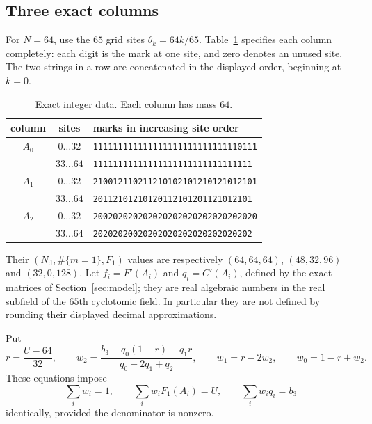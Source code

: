 \documentclass[11pt]{article}
\theoremstyle{definition}\newtheorem{definition}[theorem]{Definition}
\theoremstyle{remark}\newtheorem{remark}[theorem]{Remark}
\newcommand{\Nd}{N_{\mathrm d}}\newcommand{\one}{\mathbf 1}
\begin{document}
\subsection{Three exact columns}
For $N=64$, use the $65$ grid sites $\theta_k=64k/65$.
Table~\ref{tab:marks} specifies each column completely: each digit is the
mark at one site, and zero denotes an unused site. The two strings in a row
are concatenated in the displayed order, beginning at $k=0$.
\begin{table}[ht]\centering\small
\begin{tabular}{ccl}
\toprule
column & sites & marks in increasing site order\\\midrule
$A_0$ & $0\ldots32$ & \texttt{111111111111111111111111111110111}\\
      & $33\ldots64$ & \texttt{11111111111111111111111111111111}\\
$A_1$ & $0\ldots32$ & \texttt{210012110211210102101210121012101}\\
      & $33\ldots64$ & \texttt{20112101210120112101201121012101}\\
$A_2$ & $0\ldots32$ & \texttt{200202020202020202020202020202020}\\
      & $33\ldots64$ & \texttt{20202020020202020202020202020202}\\\bottomrule
\end{tabular}
\caption{Exact integer data. Each column has mass $64$.}\label{tab:marks}
\end{table}
Their $(\Nd,\#\{m=1\},F_1)$ values are respectively
$(64,64,64)$, $(48,32,96)$ and $(32,0,128)$.
Let $f_i=F'(A_i)$ and $q_i=C'(A_i)$, defined by the exact matrices of
Section~\ref{sec:model}; they are real algebraic numbers in the real
subfield of the $65$th cyclotomic field. In particular they are not defined
by rounding their displayed decimal approximations.

Put
\begin{equation}\label{eq:weights}
 r=\frac{U-64}{32},\qquad
 w_2=\frac{b_3-q_0(1-r)-q_1r}{q_0-2q_1+q_2},\qquad
 w_1=r-2w_2,\qquad w_0=1-r+w_2.
\end{equation}
These equations impose
\begin{equation}\label{eq:equalities}
 \sum_i w_i=1,\qquad\sum_i w_iF_1(A_i)=U,
 \qquad\sum_i w_iq_i=b_3
\end{equation}
identically, provided the denominator is nonzero.
\end{document}
